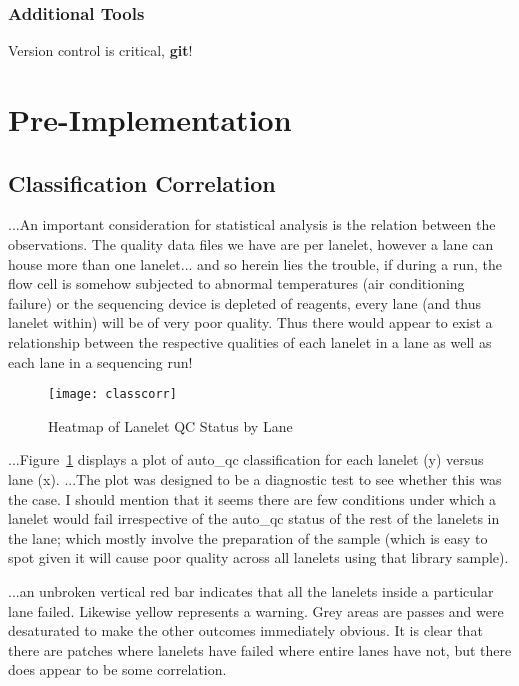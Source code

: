 \subsubsection{Additional Tools}
Version control is critical, \textbf{git}!


\section{Pre-Implementation}
\subsection{Classification Correlation}
...An important consideration for statistical analysis is the relation between the
observations. The quality data files we have are per lanelet, however a lane can
house more than one lanelet...  and so herein lies the trouble, if during a run,
the flow cell is somehow subjected to abnormal temperatures (air conditioning
failure) or the sequencing device is depleted of reagents, every lane (and thus
lanelet within) will be of very poor quality. Thus there would appear to exist a
relationship between the respective qualities of each lanelet in a lane as well
as each lane in a sequencing run!

\begin{figure}[htbp!]
    \centering
    \texttt{[image: classcorr]}
    \caption[ClassCorr]{Heatmap of Lanelet QC Status by Lane}
    \label{fig:classcorr}
\end{figure}

...Figure~\ref{fig:classcorr} displays a plot of auto\_qc classification for
each lanelet (y) versus lane (x). ...The plot was designed to be a diagnostic
test to see whether this was the case. I should mention that it seems there are
few conditions under which a lanelet would fail irrespective of the auto\_qc
status of the rest of the lanelets in the lane; which mostly involve the
preparation of the sample (which is easy to spot given it will cause poor
quality across all lanelets using that library sample).

...an unbroken vertical red bar indicates that all the lanelets inside a
particular lane failed. Likewise yellow represents a warning. Grey areas are
passes and were desaturated to make the other outcomes immediately obvious. It
is clear that there are patches where lanelets have failed where entire lanes
have not, but there does appear to be some correlation.

